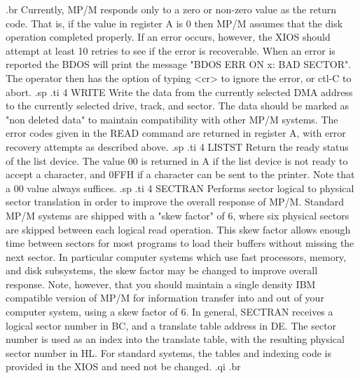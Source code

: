 .br
Currently, MP/M responds only to a zero or non-zero value as the
return code.  That is, if the value in register A is 0 then MP/M
assumes that the disk operation completed properly. If an error
occurs, however, the XIOS should attempt at least 10 retries to see
if the error is recoverable. When an error is reported the BDOS will
print the message "BDOS ERR ON x:  BAD SECTOR".  The operator then
has the option of typing <cr> to ignore the error, or ctl-C to abort.
.sp
.ti 4
WRITE       Write the data from the currently selected DMA address
to the currently selected drive, track, and sector.  The data should
be marked as "non deleted data" to maintain compatibility  with other
MP/M systems.  The error codes given in the READ command are returned
in register A, with error recovery attempts as described above.
.sp
.ti 4
LISTST      Return the ready status of the list device.
The value 00 is returned in A if the list device
is not ready to accept a character, and 0FFH if a character
can be sent to the printer.  Note that a 00 value always
suffices.
.sp
.ti 4
SECTRAN     Performs sector logical to physical sector translation
in order to improve the overall response of MP/M.  Standard MP/M
systems are shipped with a "skew factor" of 6, where six physical
sectors are skipped between each logical read operation.  This
skew factor allows enough time between sectors for most programs
to load their buffers without missing the next sector.  In particular
computer systems which use fast processors, memory, and disk
subsystems, the skew factor may be changed to improve overall
response.  Note, however, that you should maintain a single
density IBM compatible version of MP/M for information transfer into and
out of your computer system, using a skew factor of 6.
In general, SECTRAN receives a logical sector number in BC, and
a translate table address in DE.  The sector number is used as
an index into the translate table, with the resulting physical
sector number in HL.  For standard systems, the tables and
indexing code is provided in the XIOS and need not be changed.
.qi
.br
